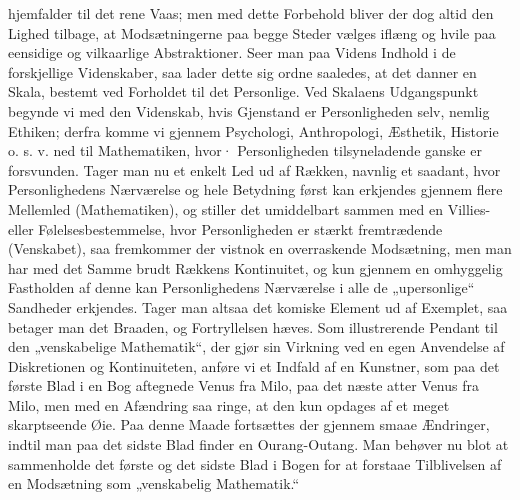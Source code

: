 \documentclass[12pt,a4paper]{book}
\newcommand{\opage}[1]{\marginnote{\footnotesize\textit{[#1]}}}
\begin{document}
hjemfalder til det rene Vaas; men med dette Forbehold
bliver der dog altid den Lighed tilbage, at Modsætningerne
paa begge Steder vælges iflæng og hvile paa eensidige og
vilkaarlige Abstraktioner. Seer man paa Videns Indhold i
de forskjellige Videnskaber, saa lader dette sig ordne saaledes,
\opage{30}\setcounter{footnote}{0}%
at det danner en Skala, bestemt ved Forholdet til det
Personlige. Ved Skalaens Udgangspunkt begynde vi
med den Videnskab, hvis Gjenstand er Personligheden
selv, nemlig Ethiken; derfra komme vi gjennem Psychologi,
Anthropologi, Æsthetik, Historie o. s. v.
ned til Mathematiken, hvor· Personligheden tilsyneladende
ganske er forsvunden. Tager man nu et enkelt Led ud
af Rækken, navnlig et saadant, hvor Personlighedens
Nærværelse og hele Betydning først kan erkjendes gjennem
flere Mellemled (Mathematiken), og stiller det umiddelbart
sammen med en Villies- eller Følelsesbestemmelse,
hvor Personligheden er stærkt fremtrædende (Venskabet),
saa fremkommer der vistnok en overraskende Modsætning,
men man har med det Samme brudt Rækkens Kontinuitet,
og kun gjennem en omhyggelig Fastholden af
denne kan Personlighedens Nærværelse i alle de „upersonlige“
Sandheder erkjendes. Tager man altsaa det
komiske Element ud af Exemplet, saa betager man det
Braaden, og Fortryllelsen hæves. Som illustrerende Pendant
til den „venskabelige Mathematik“, der gjør sin
Virkning ved en egen Anvendelse af Diskretionen og
Kontinuiteten, anføre vi et Indfald af en Kunstner, som
paa det første Blad i en Bog aftegnede Venus fra Milo,
paa det næste atter Venus fra Milo, men med en Afændring
saa ringe, at den kun opdages af et meget skarptseende
Øie. Paa denne Maade fortsættes der gjennem
smaae Ændringer, indtil man paa det sidste Blad finder
en Ourang-Outang. Man behøver nu blot at sammenholde
det første og det sidste Blad i Bogen for at forstaae
\opage{31}\setcounter{footnote}{0}%
Tilblivelsen af en Modsætning som „venskabelig Mathematik.“
\end{document}
